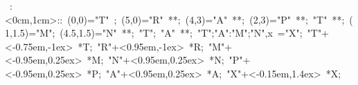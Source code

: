 

\hbox{
\xy    <1cm,0cm>:<0cm,1cm>::
       (0,0)="T" ; (5,0)="R" **\dir{-}; 
       (4,3)="A" **\dir{-};  (2,3)="P" **\dir{-}; 
       "T" **\dir{-};
       (1,1.5)="M"; (4.5,1.5)="N" **\dir{-};
       "T"; "A" **\dir{-};
       {"T";"A":"M";"N",x} ="X";
       "T"+<-0.75em,-1ex> *{T};
       "R"+<0.95em,-1ex> *{R};
       "M"+<-0.95em,0.25ex> *{M};
       "N"+<0.95em,0.25ex> *{N};
       "P"+<-0.95em,0.25ex> *{P};
       "A"+<0.95em,0.25ex> *{A};
       "X"+<-0.15em,1.4ex> *{X};
\endxy}
	   
